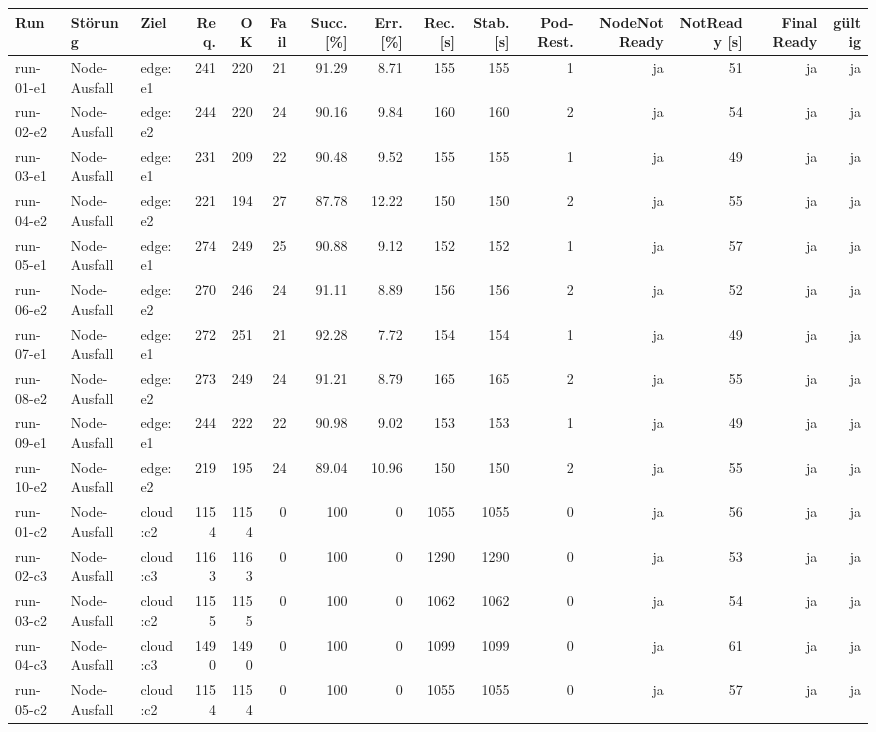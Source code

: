 \begin{table}
\centering
\scriptsize
\setlength{\tabcolsep}{3pt}
\renewcommand{\arraystretch}{1.08}
\begin{tabular}{l l p{3.2cm} r r r r r r r r r r r r}
\toprule
Run & Störung & Ziel & Req. & OK & Fail & Succ. [\%] & Err. [\%] & Rec. [s] & Stab. [s] & Pod-Rest. & NodeNotReady & NotReady [s] & Final Ready & gültig \\
\midrule
run-01-e1 & Node-Ausfall & edge:e1 & 241 & 220 & 21 & 91.29 & 8.71 & 155 & 155 & 1 & ja & 51 & ja & ja \\
run-02-e2 & Node-Ausfall & edge:e2 & 244 & 220 & 24 & 90.16 & 9.84 & 160 & 160 & 2 & ja & 54 & ja & ja \\
run-03-e1 & Node-Ausfall & edge:e1 & 231 & 209 & 22 & 90.48 & 9.52 & 155 & 155 & 1 & ja & 49 & ja & ja \\
run-04-e2 & Node-Ausfall & edge:e2 & 221 & 194 & 27 & 87.78 & 12.22 & 150 & 150 & 2 & ja & 55 & ja & ja \\
run-05-e1 & Node-Ausfall & edge:e1 & 274 & 249 & 25 & 90.88 & 9.12 & 152 & 152 & 1 & ja & 57 & ja & ja \\
run-06-e2 & Node-Ausfall & edge:e2 & 270 & 246 & 24 & 91.11 & 8.89 & 156 & 156 & 2 & ja & 52 & ja & ja \\
run-07-e1 & Node-Ausfall & edge:e1 & 272 & 251 & 21 & 92.28 & 7.72 & 154 & 154 & 1 & ja & 49 & ja & ja \\
run-08-e2 & Node-Ausfall & edge:e2 & 273 & 249 & 24 & 91.21 & 8.79 & 165 & 165 & 2 & ja & 55 & ja & ja \\
run-09-e1 & Node-Ausfall & edge:e1 & 244 & 222 & 22 & 90.98 & 9.02 & 153 & 153 & 1 & ja & 49 & ja & ja \\
run-10-e2 & Node-Ausfall & edge:e2 & 219 & 195 & 24 & 89.04 & 10.96 & 150 & 150 & 2 & ja & 55 & ja & ja \\
run-01-c2 & Node-Ausfall & cloud:c2 & 1154 & 1154 & 0 & 100 & 0 & 1055 & 1055 & 0 & ja & 56 & ja & ja \\
run-02-c3 & Node-Ausfall & cloud:c3 & 1163 & 1163 & 0 & 100 & 0 & 1290 & 1290 & 0 & ja & 53 & ja & ja \\
run-03-c2 & Node-Ausfall & cloud:c2 & 1155 & 1155 & 0 & 100 & 0 & 1062 & 1062 & 0 & ja & 54 & ja & ja \\
run-04-c3 & Node-Ausfall & cloud:c3 & 1490 & 1490 & 0 & 100 & 0 & 1099 & 1099 & 0 & ja & 61 & ja & ja \\
run-05-c2 & Node-Ausfall & cloud:c2 & 1154 & 1154 & 0 & 100 & 0 & 1055 & 1055 & 0 & ja & 57 & ja & ja \\

\end{tabular}
\end{table}
